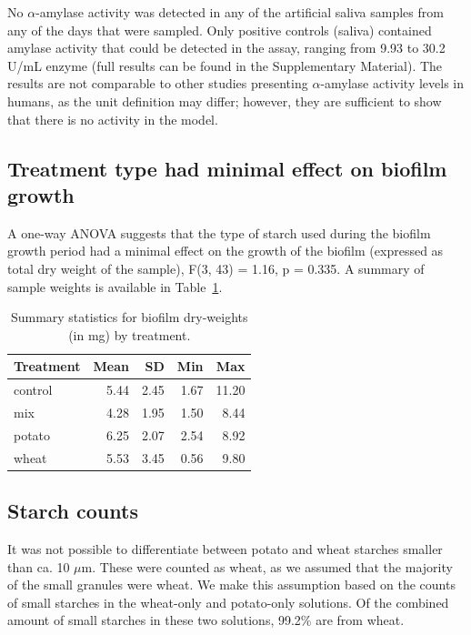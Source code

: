 \documentclass[
  b5paper,
]{book}
\begin{document}
No \(\alpha\)-amylase activity was detected in any of the artificial
saliva samples from any of the days that were sampled. Only positive
controls (saliva) contained amylase activity that could be detected in
the assay, ranging from 9.93 to 30.2 U/mL enzyme (full results can be
found in the Supplementary Material). The results are not comparable to
other studies presenting \(\alpha\)-amylase activity levels in humans,
as the unit definition may differ; however, they are sufficient to show
that there is no activity in the model.

\subsection{Treatment type had minimal effect on biofilm
growth}\label{treatment-type-had-minimal-effect-on-biofilm-growth}

A one-way ANOVA suggests that the type of starch used during the biofilm
growth period had a minimal effect on the growth of the biofilm
(expressed as total dry weight of the sample), F(3, 43) = 1.16, p =
0.335. A summary of sample weights is available in
Table~\ref{tbl-anova}.

\begin{longtable}[]{@{}lrrrr@{}}

\caption{\label{tbl-anova}Summary statistics for biofilm dry-weights (in
mg) by treatment.}

\tabularnewline

\toprule\noalign{}
Treatment & Mean & SD & Min & Max \\
\midrule\noalign{}
\endhead
\bottomrule\noalign{}
\endlastfoot
control & 5.44 & 2.45 & 1.67 & 11.20 \\
mix & 4.28 & 1.95 & 1.50 & 8.44 \\
potato & 6.25 & 2.07 & 2.54 & 8.92 \\
wheat & 5.53 & 3.45 & 0.56 & 9.80 \\

\end{longtable}

\subsection{Starch counts}\label{starch-counts}

It was not possible to differentiate between potato and wheat starches
smaller than ca. 10 \(\mu\)m. These were counted as wheat, as we assumed
that the majority of the small granules were wheat. We make this
assumption based on the counts of small starches in the wheat-only and
potato-only solutions. Of the combined amount of small starches in these
two solutions, 99.2\% are from wheat.
\end{document}
